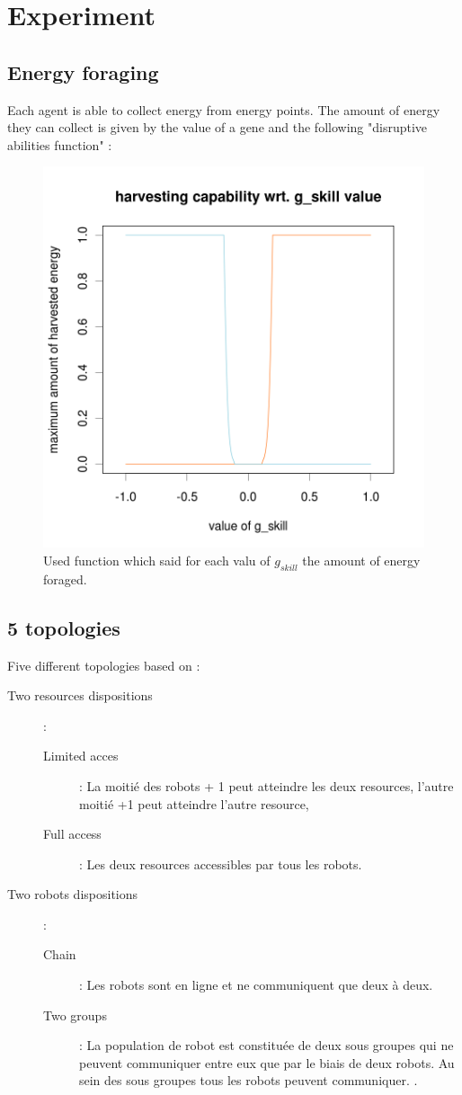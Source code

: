 \documentclass[a4paper,10pt]{article}
\begin{document}
\section{Experiment}

\subsection{Energy foraging}

Each agent is able to collect energy from energy points. The amount of energy they can collect is given by the value of a gene and the following "disruptive abilities function" :
\begin{figure}[H]
\center
\includegraphics[width=.45\textwidth]{../images/sparsityEffect/f_skill}
\caption[Foraging Abilities]{Used function which said for each valu of $g_{skill}$ the amount of energy foraged. }

\label{fig:reward}

\end{figure}



\subsection{5 topologies}

Five different topologies based on :
\begin{description}
\item[Two resources dispositions ]:

\begin{description}
\item[Limited acces ]: La moitié des robots + 1 peut atteindre les deux resources, l'autre moitié +1 peut atteindre l'autre resource,  \label{it:1acc}
\item [Full access]: Les deux resources accessibles par tous les robots.\label{it:2acc}
\end{description}

\item[	Two robots dispositions]:
\begin{description}
\item[Chain]: Les robots sont en ligne et ne communiquent que deux à deux. \label{it:ligne}
\item[Two groups]: La population de robot est constituée de deux sous groupes qui ne peuvent communiquer entre eux que par le biais de deux robots. Au sein des sous groupes tous les robots peuvent communiquer.
.\label{it:2gp}
\end{description}
\end{description}
\end{document}
